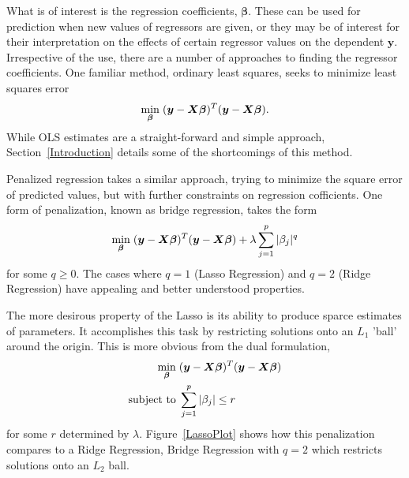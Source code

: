\documentclass{uwstat572}
\begin{document}
What is of interest is the regression coefficients, $\boldsymbol{\beta}$. These can be used for prediction when new values of regressors are given, or they may be of interest for their interpretation on the effects of certain regressor values on the dependent $\boldsymbol{y}$. Irrespective of the use, there are a number of approaches to finding the regressor coefficients. One familiar method, ordinary least squares, seeks to minimize least squares error\[
\min_{\boldsymbol{\beta}} \hspace{.1cm} (\boldsymbol{y}-\boldsymbol{X}\boldsymbol{\beta})^T(\boldsymbol{y}-\boldsymbol{X}\boldsymbol{\beta}).
\] While OLS estimates are a straight-forward and simple approach, Section~\ref{Introduction} details some of the shortcomings of this method.

Penalized regression takes a similar approach, trying to minimize the square error of predicted values, but with further constraints on regression cofficients. One form of penalization, known as bridge regression, takes the form  \[
\min_{\boldsymbol{\beta}}  \hspace{.1cm} (\boldsymbol{y}-\boldsymbol{X}\boldsymbol{\beta})^T(\boldsymbol{y}-\boldsymbol{X}\boldsymbol{\beta})+\lambda\sum_{j=1}^p|\beta_j|^q
\] for some $q\geq0$.\cite{park2008bayesian} The cases where $q=1$ (Lasso Regression) and $q=2$ (Ridge Regression) have appealing and better understood properties.

The more desirous property of the Lasso is its ability to produce sparce estimates of parameters. It accomplishes this task by restricting solutions onto an $L_1$ 'ball' around the origin. This is more obvious from the dual formulation, 
\begin{align*}
\min_{\boldsymbol{\beta}}  \hspace{.1cm} &(\boldsymbol{y}-\boldsymbol{X}\boldsymbol{\beta})^T(\boldsymbol{y}-\boldsymbol{X}\boldsymbol{\beta})\\
\text{subject to} \hspace{.1cm}&\sum_{j=1}^p|\beta_j|\leq r
\end{align*}
for some $r$ determined by $\lambda$. Figure~\ref{LassoPlot} shows how this penalization compares to a Ridge Regression, Bridge Regression with $q=2$ which restricts solutions onto an $L_2$ ball.\cite{park2008bayesian}
\end{document}
